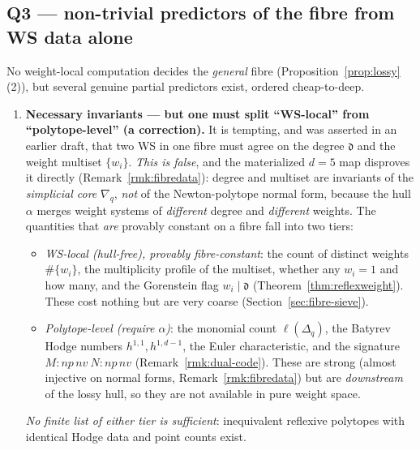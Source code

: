\documentclass{amsart}
\begin{document}
\subsection{Q3 --- non-trivial predictors of the fibre from WS data alone}
\label{sec:fibre-predict}

No weight-local computation decides the \emph{general} fibre
(Proposition~\ref{prop:lossy}\,(2)), but several genuine partial predictors
exist, ordered cheap-to-deep.

\begin{enumerate}
  \item \textbf{Necessary invariants --- but one must split ``WS-local'' from
        ``polytope-level'' (a correction).} It is tempting, and was asserted in
        an earlier draft, that two WS in one fibre must agree on the degree
        $\mathfrak d$ and the weight multiset $\{w_i\}$. \emph{This is false},
        and the materialized $d=5$ map disproves it directly
        (Remark~\ref{rmk:fibredata}): degree and multiset are invariants of the
        \emph{simplicial core} $\nabla_q$, \emph{not} of the Newton-polytope
        normal form, because the hull $\alpha$ merges weight systems of
        \emph{different} degree and \emph{different} weights. The quantities that
        \emph{are} provably constant on a fibre fall into two tiers:
        \begin{itemize}
          \item \emph{WS-local (hull-free), provably fibre-constant}: the count
                of distinct weights $\#\{w_i\}$, the multiplicity profile of the
                multiset, whether any $w_i=1$ and how many, and the Gorenstein
                flag $w_i\mid\mathfrak d$ (Theorem~\ref{thm:reflexweight}).
                These cost nothing but are very coarse (Section~\ref{sec:fibre-sieve}).
          \item \emph{Polytope-level (require $\alpha$)}: the monomial count
                $\ell(\Delta_q)$, the Batyrev Hodge numbers
                $h^{1,1},h^{1,d-1}$, the Euler characteristic, and the
                signature $M{:}np\,nv\ N{:}np\,nv$ (Remark~\ref{rmk:dual-code}).
                These are strong (almost injective on normal forms,
                Remark~\ref{rmk:fibredata}) but are \emph{downstream} of the
                lossy hull, so they are not available in pure weight space.
        \end{itemize}
        \emph{No finite list of either tier is sufficient}: inequivalent
        reflexive polytopes with identical Hodge data and point counts exist.

\end{enumerate}
\end{document}
